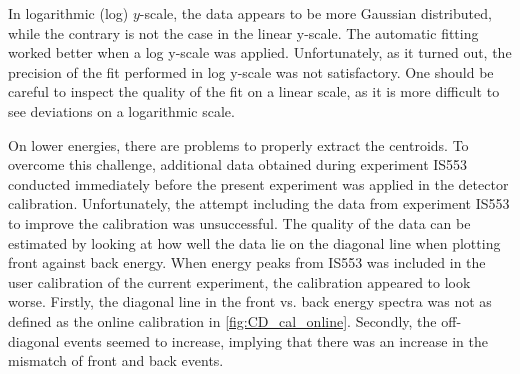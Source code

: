 \documentclass[twoside,english]{uiofysmaster/uiofysmaster}
\let\orgautoref\autoref
\renewcommand{\autoref}
        {%
		 \def\sectionautorefname{Section}%
		 \def\subsectionautorefname{Section}%
		 \def\subsubsectionautorefname{Section}%
		 \def\chapterautorefname{Chapter}%
          \orgautoref}
\begin{document}
In logarithmic (log) $y$-scale, the data appears to be more Gaussian distributed, while the contrary is not the case in the linear y-scale. 
The automatic fitting worked better when a log y-scale was applied.
Unfortunately, as it turned out, the precision of the fit performed in log y-scale was not satisfactory.
One should be careful to inspect the quality of the fit on a linear scale, as it is more difficult to see deviations on a logarithmic scale. 

On lower energies, there are problems to properly extract the centroids.
To overcome this challenge, additional data obtained during experiment IS553 conducted immediately before the present experiment was applied in the detector calibration.
Unfortunately, the attempt including the data from experiment IS553 to improve the calibration was unsuccessful.
The quality of the data can be estimated by looking at how well the data lie on the diagonal line when plotting front against back energy.
When energy peaks from IS553 was included in the user calibration of the current experiment, the calibration appeared to look worse. 
Firstly, the diagonal line in the front vs. back energy spectra was not as defined as the online calibration in \autoref{fig:CD_cal_online}.
Secondly, the off-diagonal events seemed to increase, implying that there was an increase in the mismatch of front and back events. 
\end{document}
